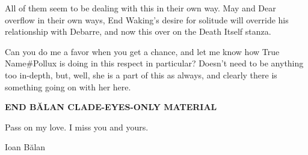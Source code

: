 All of them seem to be dealing with this in their own way. May and Dear overflow in their own ways, End Waking's desire for solitude will override his relationship with Debarre, and now this over on the Death Itself stanza.

Can you do me a favor when you get a chance, and let me know how True Name\#Pollux is doing in this respect in particular? Doesn't need to be anything too in-depth, but, well, she is a part of this as always, and clearly there is something going on with her here.

\textbf{END BĂLAN CLADE-EYES-ONLY MATERIAL}

Pass on my love. I miss you and yours.

Ioan Bălan
